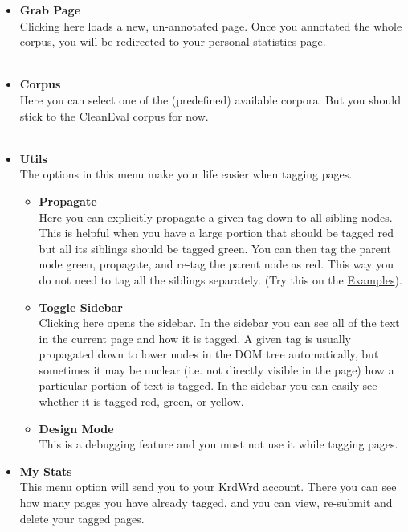 \documentclass[12pt]{article}
\begin{document}
\begin{itemize}
	\item {\large \textbf{Grab Page}}\\
Clicking here loads a new, un-annotated page. Once you annotated the whole corpus, you will be redirected to your personal statistics page. \\ \\
	\item {\large \textbf{Corpus}}\\
Here you can select one of the (predefined) available corpora. But you should stick to the CleanEval corpus for now.\\ \\
	\item {\large \textbf{Utils}}\\
The options in this menu make your life easier when tagging pages. \\
	\begin{itemize}
		\item {\large \textbf{Propagate}}\\
Here you can explicitly propagate a given tag down to all sibling nodes. This is helpful when you have a large portion that should be tagged red but all its siblings should be tagged green. You can then tag the parent node green, propagate, and re-tag the parent node as red. This way you do not need to tag all the siblings separately. (Try this on the \hyperref{Examples}{Examples, described on page~}{}{Examples}).
		\item {\large \textbf{Toggle Sidebar}}\\
Clicking here opens the sidebar. In the sidebar you can see all of the text in the current page and how it is tagged. A given tag is usually propagated down to lower nodes in the DOM tree automatically, but sometimes it may be unclear (i.e. not directly visible in the page) how a particular portion of text is tagged. In the sidebar you can easily see whether it is tagged red, green, or yellow.
		\item {\large \textbf{Design Mode}}\\
This is a debugging feature and you must not use it while tagging pages. \\
	\end{itemize}
	\item {\large \textbf{My Stats}}\\
This menu option will send you to your KrdWrd account. There you can see how many pages you have already tagged, and you can view, re-submit and delete your tagged pages. 
\end {itemize}
\end{document}
